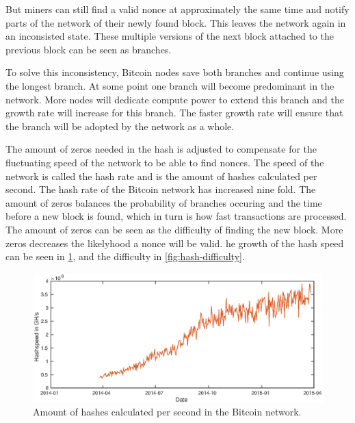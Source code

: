 But miners can still find a valid nonce at approximately the same time
and notify parts of the network of their newly found block.
This leaves the network again in an inconsisted state.
These multiple versions of the next block attached to the previous block can be seen as branches.

To solve this inconsistency, Bitcoin nodes save both branches and continue using the longest branch.
At some point one branch will become predominant in the network.
More nodes will dedicate compute power to extend this branch and the growth rate will increase for this branch.
The faster growth rate will ensure that the branch will be adopted by the network as a whole.

The amount of zeros needed in the hash is adjusted to compensate for the fluctuating speed of the network to be able to find nonces.
The speed of the network is called the hash rate and is the amount of hashes calculated per second.
The hash rate of the Bitcoin network has increased nine fold.
The amount of zeros balances the probability of branches occuring
and the time before a new block is found,
which in turn is how fast transactions are processed.
The amount of zeros can be seen as the difficulty of finding the new block.
More zeros decreases the likelyhood a nonce will be valid.
he growth of the hash speed can be seen in \ref{fig:hash-speed},
and the difficulty in \ref{fig:hash-difficulty}.

\begin{figure}[H]
        \centerline{\includegraphics[scale=0.6]{relatedWork/figs/hashspeed/hashspeed.eps}}
        \caption{Amount of hashes calculated per second in the Bitcoin network.\cite{Blockchain.info-hashspeed}}
	\label{fig:hash-speed}
\end{figure}

